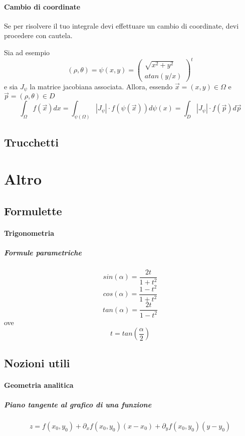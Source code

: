 \documentclass[a4paper,10pt]{book}
\begin{document}
\paragraph{Cambio di coordinate}
Se per risolvere il tuo integrale devi effettuare un cambio di coordinate, devi procedere con cautela.

Sia ad esempio $$(\rho, \theta) = \psi(x, y) = \left(\begin{matrix}\sqrt{x^2+y^2} \\ atan(y/x)\end{matrix}\right)^t$$
e sia $J_\psi$ la matrice jacobiana associata.
Allora, essendo $\vec{x} = (x, y) \in \Omega$ e $\vec{p} = (\rho, \theta) \in D$
$$ \int_\Omega f(\vec{x}) d{x} = \int_{\psi(\Omega)} |J_\psi|\cdot f(\psi(\vec{x})) d\psi(x) = \int_D |J_\psi|\cdot f(\vec{p})d\vec{p} $$

\subsection{Trucchetti}


\section{Altro}
\subsection{Formulette}
\paragraph{Trigonometria}
\subparagraph{Formule parametriche}
$$sin(\alpha) = \frac{2t}{1+t^2}$$
$$cos(\alpha) = \frac{1-t^2}{1+t^2}$$
$$tan(\alpha) = \frac{2t}{1-t^2}$$
ove $$t = tan\left(\frac{\alpha}{2}\right)$$
\subsection{Nozioni utili}
\paragraph{Geometria analitica}
\subparagraph{Piano tangente al grafico di una funzione}
$$z = f(x_0, y_0) + \partial_x f(x_0, y_0) (x-x_0) + \partial_y f(x_0, y_0) (y - y_0) $$
\end{document}
